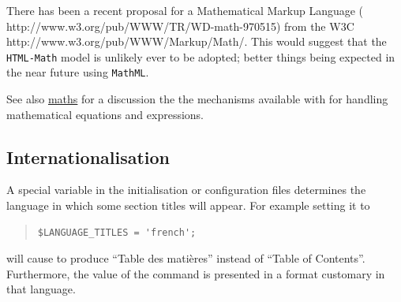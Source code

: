 \begin{htmllist}
There has been a recent proposal for a Mathematical Markup Language
(%
{http://www.w3.org/pub/WWW/TR/WD-math-970515}) 
from the W3C %
{http://www.w3.org/pub/WWW/Markup/Math/}. 
This would suggest that the \texttt{HTML-Math} model is unlikely 
ever to be adopted; better things being expected in the near future
using \texttt{MathML}.

See also \hyperref{another page}{Section~}{}{maths} for a discussion
the the mechanisms available with \latextohtml{} for handling
mathematical equations and expressions.
\end{htmllist}




\subsection{Internationalisation\label{internat}}%
\html{\\}%
A special variable  
in the initialisation or configuration files determines the language 
in which some section titles will appear. For example setting it to 
\begin{quote}
\begin{verbatim}
$LANGUAGE_TITLES = 'french';
\end{verbatim}
\end{quote}
will cause \latextohtml{} to produce ``Table des mati{\`e}res'' instead of
``Table of Contents''.
Furthermore, the value of the  command is presented in a format
customary in that language.


